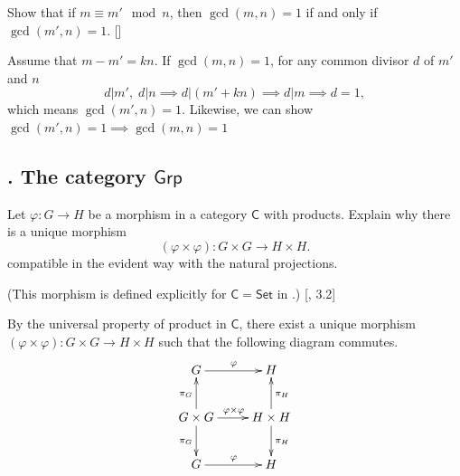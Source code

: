 \documentclass[12pt,letterpaper,boxed]{hmcpset}
\begin{document}
\begin{problem}[2.17]	
	Show that if $m\equiv m'\mod n$, then $\gcd(m,n) = 1$ if and only if $\gcd(m',n)=1$. []
\end{problem}
\begin{solution}
	Assume that $m-m'=kn$. If $\gcd(m,n) = 1$, for any common divisor $d$ of $m'$ and $n$
	\[
	d|m',\;d|n\implies d|(m'+kn)\implies d|m\implies d=1,
	\]
	which means $\gcd(m',n)=1$. Likewise, we can show $\gcd(m',n) = 1\implies\gcd(m,n)=1$
\end{solution}


\subsection{. The category $\mathsf{Grp}$} 

\begin{problem}[3.1]	
	Let $\varphi : G\rightarrow H$ be a morphism in a category $\mathsf{C}$ with products. Explain why
	there is a unique morphism
	\[
	(\varphi\times\varphi) : G \times G \longrightarrow H \times H .
	\]
	compatible in the evident way with the natural projections.
	
	(This morphism is defined explicitly for $\mathsf{C} = \mathsf{Set}$ in .) [, 3.2]
\end{problem}
\begin{solution}
	By the universal property of product in $\mathsf{C}$, there exist a unique morphism $(\varphi\times\varphi) : G \times G \longrightarrow H \times H$ such that the following diagram commutes.
    \[\xymatrix{
    	G\ar[r]^{\varphi} & H \\
    	G \times G\ar[u]^{\pi_G}\ar[d]_{\pi_G}\ar[r]^{\varphi\times\varphi} &  H\times H\ar[u]_{\pi_H}\ar[d]^{\pi_H} \\
    	G\ar[r]^{\varphi} & H 
    }\]
\end{solution}
\end{document}
